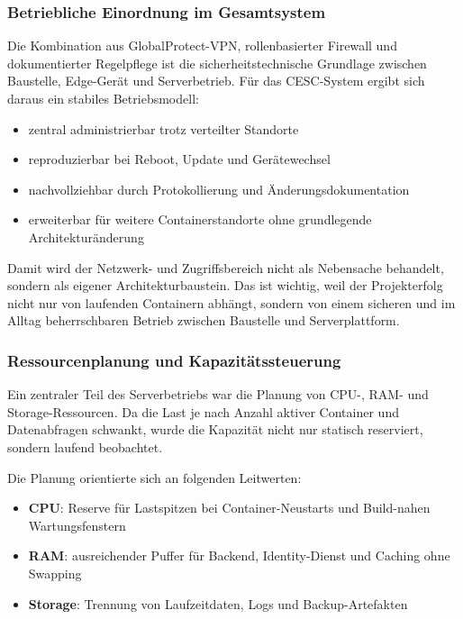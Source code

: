 \subsubsection{Betriebliche Einordnung im Gesamtsystem}

Die Kombination aus GlobalProtect-VPN, rollenbasierter Firewall und dokumentierter Regelpflege ist die sicherheitstechnische Grundlage zwischen Baustelle, Edge-Gerät und Serverbetrieb. Für das CESC-System ergibt sich daraus ein stabiles Betriebsmodell:

\begin{itemize}
    \item zentral administrierbar trotz verteilter Standorte
    \item reproduzierbar bei Reboot, Update und Gerätewechsel
    \item nachvollziehbar durch Protokollierung und Änderungsdokumentation
    \item erweiterbar für weitere Containerstandorte ohne grundlegende Architekturänderung
\end{itemize}

Damit wird der Netzwerk- und Zugriffsbereich nicht als Nebensache behandelt, sondern als eigener Architekturbaustein. Das ist wichtig, weil der Projekterfolg nicht nur von laufenden Containern abhängt, sondern von einem sicheren und im Alltag beherrschbaren Betrieb zwischen Baustelle und Serverplattform.

\subsubsection{Ressourcenplanung und Kapazitätssteuerung}

Ein zentraler Teil des Serverbetriebs war die Planung von CPU-, RAM- und Storage-Ressourcen. Da die Last je nach Anzahl aktiver Container und Datenabfragen schwankt, wurde die Kapazität nicht nur statisch reserviert, sondern laufend beobachtet.

Die Planung orientierte sich an folgenden Leitwerten:

\begin{itemize}
    \item \textbf{CPU}: Reserve für Lastspitzen bei Container-Neustarts und Build-nahen Wartungsfenstern
    \item \textbf{RAM}: ausreichender Puffer für Backend, Identity-Dienst und Caching ohne Swapping
    \item \textbf{Storage}: Trennung von Laufzeitdaten, Logs und Backup-Artefakten
\end{itemize}

